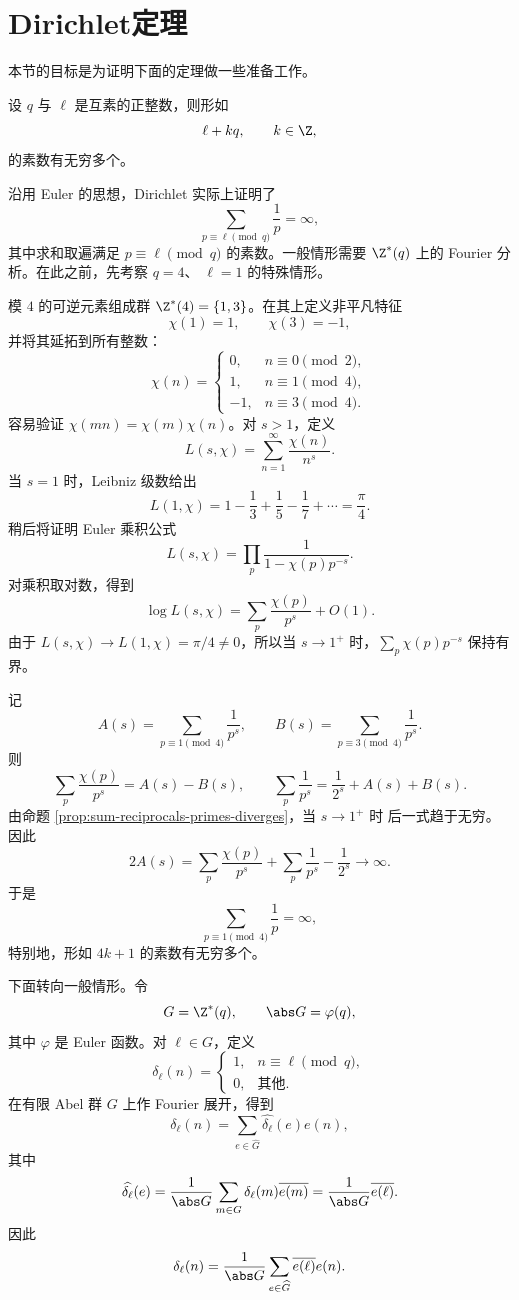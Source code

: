 \section{Dirichlet定理}

本节的目标是为证明下面的定理做一些准备工作。

\begin{theorem}[Dirichlet定理]\label{thm:dirichlet-primes-arithmetic-progressions}
	设 $q$ 与 $\ell$ 是互素的正整数，则形如
	\[
	\ell+kq,\qquad k\in\Z,
	\]
	的素数有无穷多个。
\end{theorem}

沿用 Euler 的思想，Dirichlet 实际上证明了
\[
\sum_{p\equiv\ell\pmod q}\frac1p=\infty,
\]
其中求和取遍满足 $p\equiv\ell\pmod q$ 的素数。一般情形需要
$\Z^*(q)$ 上的 Fourier 分析。在此之前，先考察 $q=4$、
$\ell=1$ 的特殊情形。

模 $4$ 的可逆元素组成群 $\Z^*(4)=\{1,3\}$。在其上定义非平凡特征
\[
\chi(1)=1,\qquad \chi(3)=-1,
\]
并将其延拓到所有整数：
\[
\chi(n)=
\begin{cases}
	0,&n\equiv0\pmod 2,\\
	1,&n\equiv1\pmod 4,\\
	-1,&n\equiv3\pmod 4.
\end{cases}
\]
容易验证 $\chi(mn)=\chi(m)\chi(n)$。对 $s>1$，定义
\[
L(s,\chi)=\sum_{n=1}^{\infty}\frac{\chi(n)}{n^s}.
\]
当 $s=1$ 时，Leibniz 级数给出
\[
L(1,\chi)=1-\frac13+\frac15-\frac17+\cdots=\frac\pi4.
\]
稍后将证明 Euler 乘积公式
\[
L(s,\chi)=\prod_p\frac1{1-\chi(p)p^{-s}}.
\]
对乘积取对数，得到
\[
\log L(s,\chi)=\sum_p\frac{\chi(p)}{p^s}+O(1).
\]
由于 $L(s,\chi)\to L(1,\chi)=\pi/4\neq0$，所以当
$s\to1^+$ 时，$\sum\limits_p\chi(p)p^{-s}$ 保持有界。

记
\[
A(s)=\sum_{p\equiv1\pmod4}\frac1{p^s},\qquad
B(s)=\sum_{p\equiv3\pmod4}\frac1{p^s}.
\]
则
\[
\sum_p\frac{\chi(p)}{p^s}=A(s)-B(s),
\qquad
\sum_p\frac1{p^s}=\frac1{2^s}+A(s)+B(s).
\]
由命题 \ref{prop:sum-reciprocals-primes-diverges}，当 $s\to1^+$ 时
后一式趋于无穷。因此
\[
2A(s)=\sum_p\frac{\chi(p)}{p^s}
+\sum_p\frac1{p^s}-\frac1{2^s}\longrightarrow\infty.
\]
于是
\[
\sum_{p\equiv1\pmod4}\frac1p=\infty,
\]
特别地，形如 $4k+1$ 的素数有无穷多个。

下面转向一般情形。令
\[
G=\Z^*(q),\qquad \abs G=\varphi(q),
\]
其中 $\varphi$ 是 Euler 函数。对 $\ell\in G$，定义
\[
\delta_\ell(n)=
\begin{cases}
	1,&n\equiv\ell\pmod q,\\
	0,&\text{其他}.
\end{cases}
\]
在有限 Abel 群 $G$ 上作 Fourier 展开，得到
\[
\delta_\ell(n)=\sum_{e\in\widehat G}\widehat{\delta_\ell}(e)e(n),
\]
其中
\[
\widehat{\delta_\ell}(e)
=\frac1{\abs G}\sum_{m\in G}\delta_\ell(m)\overline{e(m)}
=\frac1{\abs G}\overline{e(\ell)}.
\]
因此
\[
\delta_\ell(n)=\frac1{\abs G}\sum_{e\in\widehat G}
\overline{e(\ell)}e(n).
\]

